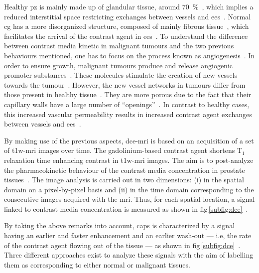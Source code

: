 Healthy \ac{pz} is mainly made up of glandular tissue, around \SI{70}{\percent}~\cite{Choi2007}, which implies a reduced interstitial space restricting exchanges between vessels and \ac{ees}~\cite{Buckley2004,Niekerk2009}.
Normal \ac{cg} has a more disorganized structure, composed of mainly fibrous tissue~\cite{Choi2007,Hoeks2011}, which facilitates the arrival of the contrast agent in \ac{ees}~\cite{Niekerk2013}.
To understand the difference between contrast media kinetic in malignant tumours and the two previous behaviours mentioned, one has to focus on the process known as angiogenesis~\cite{Carmeliet2000}.
In order to ensure growth, malignant tumours produce and release angiogenic promoter substances~\cite{Carmeliet2000}.
These molecules stimulate the creation of new vessels towards the tumour~\cite{Carmeliet2000}.
However, the new vessel networks in tumours differ from those present in healthy tissue~\cite{Gribbestad2005}.
They are more porous due to the fact that their capillary walls have a large number of ``openings''~\cite{Gribbestad2005,Choi2007}.
In contrast to healthy cases, this increased vascular permeability results in increased contrast agent exchanges between vessels and \ac{ees}~\cite{Verma2012}.

By making use of the previous aspects, \ac{dce}-\ac{mri} is based on an acquisition of a set of \ac{t1w}-\ac{mri} images over time.
The gadolinium-based contrast agent shortens T$_1$ relaxation time enhancing contrast in \ac{t1w}-\ac{mri} images.
The aim is to post-analyze the pharmacokinetic behaviour of the contrast media concentration in prostate tissues~\cite{Verma2012}.
The image analysis is carried out in two dimensions: (i) in the spatial domain on a pixel-by-pixel basis and (ii) in the time domain corresponding to the consecutive images acquired with the \ac{mri}.
Thus, for each spatial location, a signal linked to contrast media concentration is measured as shown in \acs{fig}\,\ref{subfig:dce}~\cite{Tofts2010}. 

By taking the above remarks into account, \acp{cap} is characterized by a signal having an earlier and faster enhancement and an earlier wash-out --- i.e, the rate of the contrast agent flowing out of the tissue --- as shown in \acs{fig}\,\ref{subfig:dce}~\cite{Verma2012}.
Three different approaches exist to analyze these signals with the aim of labelling them as corresponding to either normal or malignant tissues.

